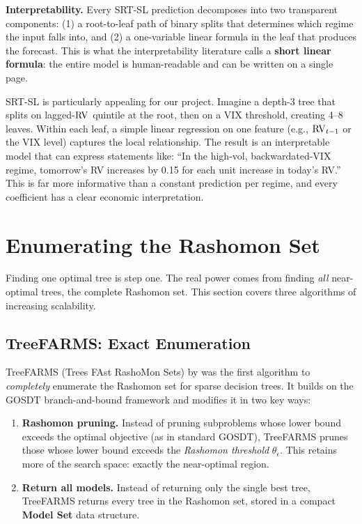 \textbf{Interpretability.}  Every SRT-SL prediction decomposes into two
transparent components: (1) a root-to-leaf path of binary splits that
determines which regime the input falls into, and (2) a one-variable
linear formula in the leaf that produces the forecast.  This is what the
interpretability literature calls a \textbf{short linear formula}: the
entire model is human-readable and can be written on a single page.

\begin{projectconnection}
SRT-SL is particularly appealing for our project.  Imagine a depth-3 tree
that splits on lagged-$\operatorname{RV}$ quintile at the root, then on a VIX threshold,
creating 4--8 leaves.  Within each leaf, a simple linear regression on one
feature (e.g., $\operatorname{RV}_{t-1}$ or the VIX level) captures the local
relationship.  The result is an interpretable model that can express
statements like: ``In the high-vol, backwardated-VIX regime, tomorrow's RV
increases by 0.15 for each unit increase in today's RV.''  This is far more
informative than a constant prediction per regime, and every coefficient
has a clear economic interpretation.
\end{projectconnection}


\section{Enumerating the Rashomon Set}\label{sec:rashomon:enumeration}

Finding one optimal tree is step one.  The real power comes from finding
\emph{all} near-optimal trees, the complete Rashomon set.  This section
covers three algorithms of increasing scalability.

\subsection{TreeFARMS: Exact Enumeration}\label{sec:rashomon:treefarms}

TreeFARMS (Trees FAst RashoMon Sets) by \citet{XinEtAl2022} was the first
algorithm to \emph{completely} enumerate the Rashomon set for sparse decision
trees.  It builds on the GOSDT branch-and-bound framework and modifies it in
two key ways:

\begin{enumerate}[leftmargin=1.8em]
  \item \textbf{Rashomon pruning.}  Instead of pruning subproblems whose
    lower bound exceeds the optimal objective (as in standard GOSDT),
    TreeFARMS prunes those whose lower bound exceeds the \emph{Rashomon
    threshold} $\theta_\epsilon$.  This retains more of the search space:
    exactly the near-optimal region.

  \item \textbf{Return all models.}  Instead of returning only the single
    best tree, TreeFARMS returns every tree in the Rashomon set, stored in a
    compact \textbf{Model Set} data structure.
\end{enumerate}

